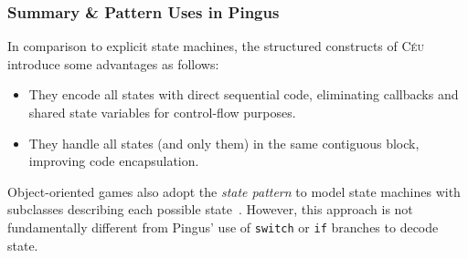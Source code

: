 \documentclass[10pt, conference, compsocconf]{IEEEtran}
\newcommand{\CEU}{\textsc{C\'{e}u}\xspace}
\newcommand{\code}[1] {{\small{\texttt{#1}}}}
\begin{document}

\subsubsection{Summary \& Pattern Uses in Pingus}

In comparison to explicit state machines, the structured constructs of \CEU
introduce some advantages as follows:
%
\begin{itemize}
\item They encode all states with direct sequential code, eliminating callbacks
      and shared state variables for control-flow purposes.
\item They handle all states (and only them) in the same contiguous block,
      improving code encapsulation.
\end{itemize}
%
Object-oriented games also adopt the \emph{state pattern} to model state
machines with subclasses describing each possible state~\cite{games.patterns}.
However, this approach is not fundamentally different from Pingus' use of
\code{switch} or \code{if} branches to decode state.
\end{document}
